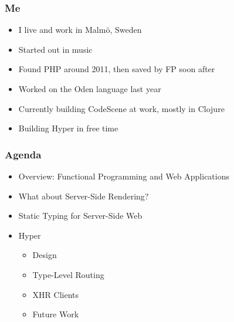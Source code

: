 \begin{frame}
  \titlepage
\end{frame}

\begin{frame}
  \frametitle{Me}
  \begin{itemize}
    \pause
    \item<+-> I live and work in Malm\"{o}, Sweden
    \item<+-> Started out in music
    \item<+-> Found PHP around 2011, then saved by FP soon after
    \item<+-> Worked on the Oden language last year
    \item<+-> Currently building CodeScene at work, mostly in Clojure
    \item<+-> Building Hyper in free time
  \end{itemize}
\end{frame}

\begin{frame}
  \frametitle{Agenda}
  \begin{itemize}
    \pause
    \item<+-> Overview: Functional Programming and Web Applications
    \item<+-> What about Server-Side Rendering?
    \item<+-> Static Typing for Server-Side Web
    \item<+-> Hyper
			\begin{itemize}
				\item<+-> Design
				\item<+-> Type-Level Routing
				\item<+-> XHR Clients
				\item<+-> Future Work
			\end{itemize}
  \end{itemize}
\end{frame}


